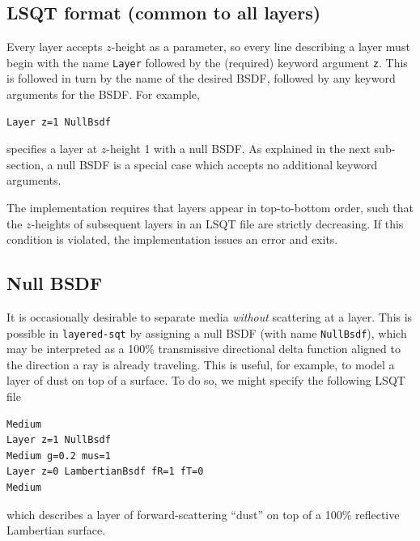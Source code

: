\documentclass[
    twoside,
    twocolumn,
    letterpaper,
    10pt]{article}
\begin{document}
\subsection{LSQT format (common to all layers)}

Every layer accepts $z$-height as a parameter, so every line describing a 
layer must begin with the name \texttt{Layer} followed by the (required) 
keyword argument \texttt{z}. This is followed in turn by the name of the 
desired BSDF, followed by any keyword arguments for the BSDF. For example,
\begin{verbatim}
Layer z=1 NullBsdf
\end{verbatim}
specifies a layer at $z$-height 1 with a null BSDF. As explained in 
the next sub-section, a null BSDF is a special case which accepts no additional
keyword arguments.

The implementation requires that layers appear in top-to-bottom order,
such that the $z$-heights of subsequent layers in an LSQT file are
strictly decreasing. If this condition 
is violated, the implementation issues an error and exits.

\subsection{Null BSDF}

It is occasionally desirable to separate media 
\emph{without} scattering at a layer. This is possible in
\texttt{layered-sqt} by assigning a null BSDF (with name 
\texttt{NullBsdf}), which may be interpreted as a 100\% transmissive 
directional delta function aligned to the direction a ray is already 
traveling. This is useful, for example, to model a layer of dust on 
top of a surface. To do so, we might specify the following
LSQT file
\begin{verbatim}
Medium
Layer z=1 NullBsdf
Medium g=0.2 mus=1
Layer z=0 LambertianBsdf fR=1 fT=0
Medium
\end{verbatim}
which describes a layer of forward-scattering ``dust'' on top 
of a 100\% reflective Lambertian surface.
\end{document}
